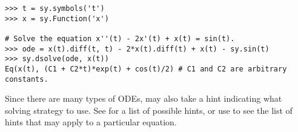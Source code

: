 \begin{lstlisting}
>>> t = sy.symbols('t')
>>> x = sy.Function('x')

# Solve the equation x''(t) - 2x'(t) + x(t) = sin(t).
>>> ode = x(t).diff(t, t) - 2*x(t).diff(t) + x(t) - sy.sin(t)
>>> sy.dsolve(ode, x(t))
Eq(x(t), (C1 + C2*t)*exp(t) + cos(t)/2) # C1 and C2 are arbitrary constants.
\end{lstlisting}

Since there are many types of ODEs,  may also take a hint indicating what solving strategy to use.
See  for a list of possible hints, or use  to see the list of hints that may apply to a particular equation.

\begin{comment}
\begin{problem}
Return the solution to the following differential equation.
\begin{equation*}
 y_{xxx} + 3y_{xx} + 3y_{x} + y = x^{5}e^x + x^{4}\sin\left(x\right) + x^{3}\cos\left(3x\right)
\end{equation*}

Check the result $y(x)$ by plugging it back into an expression where one side of the equation is subtracted to another.
Use the \li{doit()} and \li{simplify()} methods to ensure that the new expression simplifies to $0$.
\end{problem}
\end{comment}
